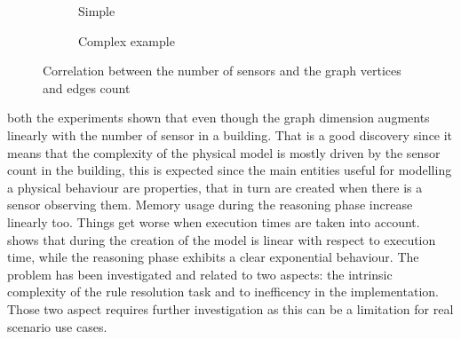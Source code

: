 \begin{figure}
  \centering
  \begin{subfigure}[b]{.475\textwidth}
      \caption{Simple}
      \label{fig:simple_scaling}
  \end{subfigure}
  \begin{subfigure}[b]{.475\textwidth}
    \caption{Complex example}
    \label{fig:complex_scaling}
  \end{subfigure}
  \centering
  \caption{Correlation between the number of sensors and the graph vertices and edges count}
  \label{fig:sensor_vertexes_chart}
\end{figure}
both the experiments shown that even though the graph dimension augments linearly with the number of sensor in a building. That is a good discovery since it means that the complexity of the physical model is mostly driven by the sensor count in the building, this is expected since the main entities useful for modelling a physical behaviour are properties, that in turn are created when there is a sensor observing them. Memory usage during the reasoning phase increase linearly too. Things get worse when execution times are taken into account. shows that during the creation of the model is linear with respect to execution time, while the reasoning phase exhibits a clear exponential behaviour. The problem has been investigated and related to two aspects: the intrinsic complexity of the rule resolution task and to inefficency in the implementation. Those two aspect requires further investigation as this can be a limitation for real scenario use cases.

